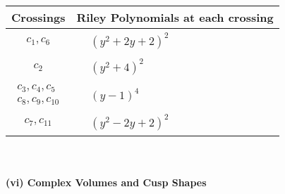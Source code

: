 \documentclass[1p]{elsarticle_modified}
\theoremstyle{definition}
\begin{document}
\begin{tabular}{m{50pt}|m{274pt}}
Crossings & \hspace{64pt}Riley Polynomials at each crossing \\
\hline $$\begin{aligned}c_{1},c_{6}\end{aligned}$$&$\begin{aligned}
&(y^2+2 y+2)^2
\end{aligned}$\\
\hline $$\begin{aligned}c_{2}\end{aligned}$$&$\begin{aligned}
&(y^2+4)^2
\end{aligned}$\\
\hline $$\begin{aligned}c_{3},c_{4},c_{5}\\c_{8},c_{9},c_{10}\end{aligned}$$&$\begin{aligned}
&(y-1)^4
\end{aligned}$\\
\hline $$\begin{aligned}c_{7},c_{11}\end{aligned}$$&$\begin{aligned}
&(y^2-2 y+2)^2
\end{aligned}$\\
\hline
\end{tabular}\\~\\
\newpage\flushleft \textbf{(vi) Complex Volumes and Cusp Shapes}
\end{document}
